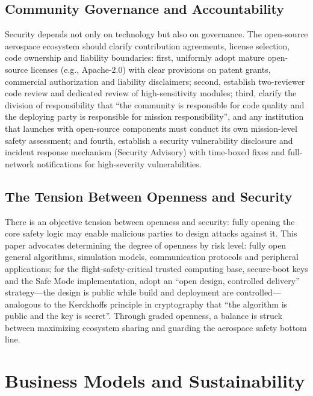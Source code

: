 \documentclass[11pt]{article}
\begin{document}
\subsection{Community Governance and Accountability}
Security depends not only on technology but also on governance. The open-source aerospace ecosystem should clarify contribution agreements, license selection, code ownership and liability boundaries: first, uniformly adopt mature open-source licenses (e.g., Apache-2.0) with clear provisions on patent grants, commercial authorization and liability disclaimers; second, establish two-reviewer code review and dedicated review of high-sensitivity modules; third, clarify the division of responsibility that ``the community is responsible for code quality and the deploying party is responsible for mission responsibility'', and any institution that launches with open-source components must conduct its own mission-level safety assessment; and fourth, establish a security vulnerability disclosure and incident response mechanism (Security Advisory) with time-boxed fixes and full-network notifications for high-severity vulnerabilities.

\subsection{The Tension Between Openness and Security}
There is an objective tension between openness and security: fully opening the core safety logic may enable malicious parties to design attacks against it. This paper advocates determining the degree of openness by risk level: fully open general algorithms, simulation models, communication protocols and peripheral applications; for the flight-safety-critical trusted computing base, secure-boot keys and the Safe Mode implementation, adopt an ``open design, controlled delivery'' strategy---the design is public while build and deployment are controlled---analogous to the Kerckhoffs principle in cryptography that ``the algorithm is public and the key is secret''. Through graded openness, a balance is struck between maximizing ecosystem sharing and guarding the aerospace safety bottom line.

\section{Business Models and Sustainability}
\end{document}

